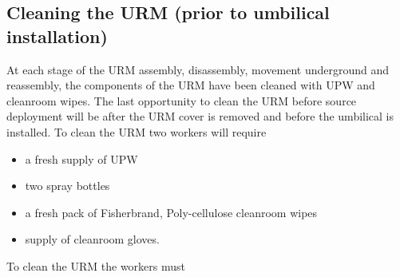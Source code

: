 \documentclass[11pt]{article}
\begin{document}
\subsection{Cleaning the URM (prior to umbilical installation)}\label{ss:cleanURM}
At each stage of the URM assembly, disassembly, movement underground and reassembly, the components of the URM have been cleaned with UPW and cleanroom wipes. The last opportunity to clean the URM before source deployment will be after the URM cover is removed and before the umbilical is installed. To clean the URM two workers will require
\begin{itemize}[label=$\square$]
\item a fresh supply of UPW
\item two spray bottles
\item a fresh pack of Fisherbrand, Poly-cellulose cleanroom wipes
\item supply of cleanroom gloves.
\end{itemize}
To clean the URM the workers must
\end{document}
